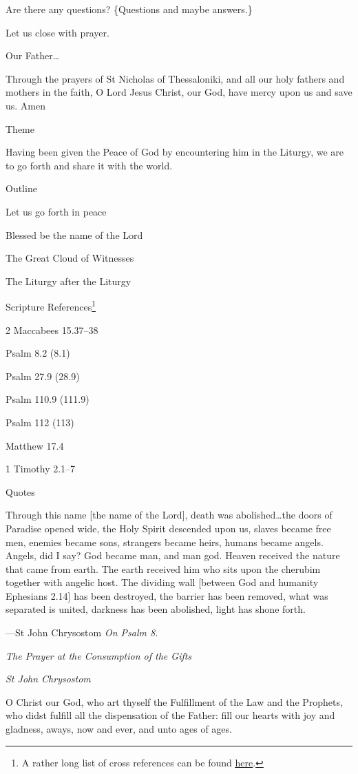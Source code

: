 \documentclass[
]{article}
\begin{document}
Are there any questions? \{Questions and maybe answers.\}

Let us close with prayer.

Our Father\ldots{}

Through the prayers of St Nicholas of Thessaloniki, and all our holy
fathers and mothers in the faith, O Lord Jesus Christ, our God, have
mercy upon us and save us. Amen

Theme

Having been given the Peace of God by encountering him in the Liturgy,
we are to go forth and share it with the world.

Outline

Let us go forth in peace

Blessed be the name of the Lord

The Great Cloud of Witnesses

The Liturgy after the Liturgy

Scripture References\footnote{A rather long list of cross references can
  be found
  \href{http://jimmyakin.com/deuterocanonical-references-in-the-new-testament}{\ul{here}}.}

2 Maccabees 15.37--38

Psalm 8.2 (8.1)

Psalm 27.9 (28.9)

Psalm 110.9 (111.9)

Psalm 112 (113)

Matthew 17.4

1 Timothy 2.1--7

Quotes

Through this name {[}the name of the Lord{]}, death was
abolished\ldots the doors of Paradise opened wide, the Holy Spirit
descended upon us, slaves became free men, enemies became sons,
strangers became heirs, humans became angels. Angels, did I say? God
became man, and man god. Heaven received the nature that came from
earth. The earth received him who sits upon the cherubim together with
angelic host. The dividing wall {[}between God and humanity Ephesians
2.14{]} has been destroyed, the barrier has been removed, what was
separated is united, darkness has been abolished, light has shone forth.

---St John Chrysostom \emph{On Psalm 8.}

\emph{The Prayer at the Consumption of the Gifts}

\emph{St John Chrysostom}

O Christ our God, who art thyself the Fulfillment of the Law and the
Prophets, who didst fulfill all the dispensation of the Father: fill our
hearts with joy and gladness, aways, now and ever, and unto ages of
ages.
\end{document}
